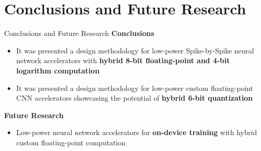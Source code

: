 \section{Conclusions and Future Research}
\tableofcontents[currentsection]
	\begin{frame}{Conclusions and Future Research}
		\textbf{Conclusions}
		\begin{itemize}
			\item<1-> It was presented a design methodology for low-power Spike-by-Spike neural network accelerators with \textbf{hybrid 8-bit floating-point and 4-bit logarithm computation}
			\item<2-> It was presented a design methodology for low-power custom floating-point CNN accelerators showcasing the potential of \textbf{hybrid 6-bit quantization}
		\end{itemize}
		
		\pause[4] %
		
		\textbf{Future Research}
		\begin{itemize}
			\item<4-> Low-power neural network accelerators for \textbf{on-device training} with hybrid custom floating-point computation
		\end{itemize}
	\end{frame}
